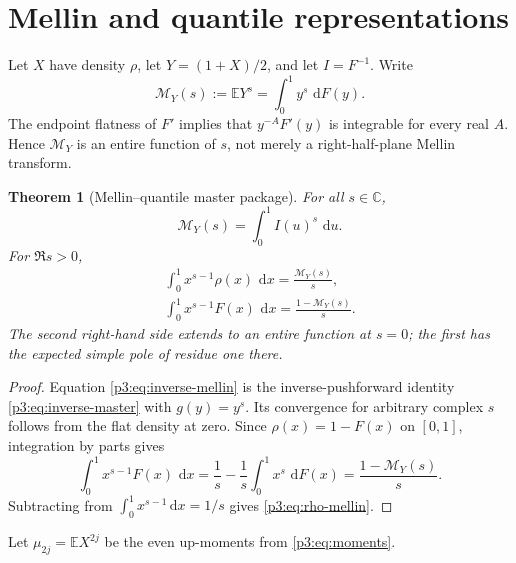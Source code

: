 \documentclass[11pt,oneside]{article}
\newtheorem{theorem}{Theorem}[section]
\theoremstyle{definition}
\newcommand{\dd}{\,\mathrm d}
\newcommand{\E}{\mathbb E}
\newcommand{\C}{\mathbb C}
\begin{document}
\section{Mellin and quantile representations}
\label{p3:sec:mellin-quantile}

Let \(X\) have density \(\rho\), let \(Y=(1+X)/2\), and let
\(I=F^{-1}\).  Write
\begin{equation}
 \mathcal M_Y(s):=\E Y^s=\int_0^1y^s\,\dd F(y).             \label{p3:eq:MY-def}
\end{equation}
The endpoint flatness of \(F'\) implies that \(y^{-A}F'(y)\) is integrable for every
real \(A\).  Hence \(\mathcal M_Y\) is an entire function of \(s\), not merely a
right-half-plane Mellin transform.

\begin{theorem}[Mellin--quantile master package]
\label{p3:thm:mellin-master}
For all \(s\in\C\),
\begin{equation}
\boxed{
 \mathcal M_Y(s)=\int_0^1 I(u)^s\,\dd u.}                  \label{p3:eq:inverse-mellin}
\end{equation}
For \(\Re s>0\),
\begin{align}
 \boxed{
 \int_0^1x^{s-1}\rho(x)\,\dd x
 =\frac{\mathcal M_Y(s)}s,}                               \label{p3:eq:rho-mellin}\\
 \boxed{
 \int_0^1x^{s-1}F(x)\,\dd x
 =\frac{1-\mathcal M_Y(s)}s.}                             \label{p3:eq:F-mellin}
\end{align}
The second right-hand side extends to an entire function at \(s=0\); the first has the
expected simple pole of residue one there.
\end{theorem}

\begin{proof}
Equation \eqref{p3:eq:inverse-mellin} is the inverse-pushforward identity
\eqref{p3:eq:inverse-master} with \(g(y)=y^s\).  Its convergence for arbitrary complex
\(s\) follows from the flat density at zero.  Since \(\rho(x)=1-F(x)\) on \([0,1]\),
integration by parts gives
\[
 \int_0^1x^{s-1}F(x)\,\dd x
 =\frac1s-\frac1s\int_0^1x^s\,\dd F(x)
 =\frac{1-\mathcal M_Y(s)}s.
\]
Subtracting from \(\int_0^1x^{s-1}\dd x=1/s\) gives
\eqref{p3:eq:rho-mellin}.
\end{proof}

Let \(\mu_{2j}=\E X^{2j}\) be the even up-moments from \eqref{p3:eq:moments}.
\end{document}

